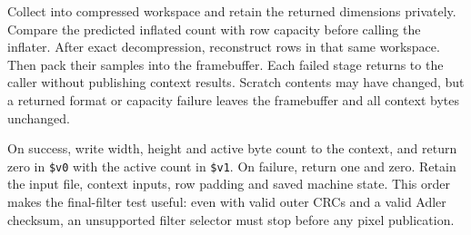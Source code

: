 Collect into compressed workspace and retain the returned dimensions privately.
Compare the predicted inflated count with row capacity before calling the inflater.
After exact decompression, reconstruct rows in that same workspace. Then pack their
samples into the framebuffer. Each failed stage returns to the caller without
publishing context results. Scratch contents may have changed, but a returned format
or capacity failure leaves the framebuffer and all context bytes unchanged.

On success, write width, height and active byte count to the context, and return zero
in \texttt{\$v0} with the active count in \texttt{\$v1}. On failure, return one and
zero. Retain the input file, context inputs, row padding and saved machine state.
This order makes the final-filter test useful: even with valid outer CRCs and a valid
Adler checksum, an unsupported filter selector must stop before any pixel publication.
